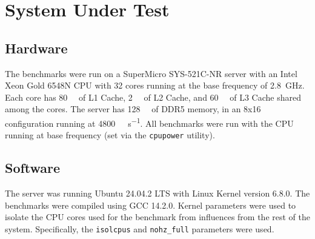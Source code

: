\section{System Under Test}
\subsection{Hardware}
The benchmarks were run on a SuperMicro SYS-521C-NR server with an Intel Xeon Gold 6548N CPU with 32 cores
running at the base frequency of \SI{2.8}{\giga\hertz}.
Each core has \SI{80}{\kilo\byte} of L1 Cache, \SI{2}{\mega\byte} of L2 Cache, and \SI{60}{\mega\byte} of L3
Cache shared among the cores.
The server has \SI{128}{\giga\byte} of DDR5 memory, in an 8x\SI{16}{\giga\byte} configuration running at
\SI{4800}{\mega\transfer\per\second}.
All benchmarks were run with the CPU running at base frequency (set via the \texttt{cpupower} utility).

\subsection{Software}
The server was running Ubuntu 24.04.2 LTS with Linux Kernel version 6.8.0.
The benchmarks were compiled using GCC 14.2.0.
Kernel parameters were used to isolate the CPU cores used for the benchmark from influences from the rest of the system.
Specifically, the \texttt{isolcpus} and \texttt{nohz\_full} parameters were used.
